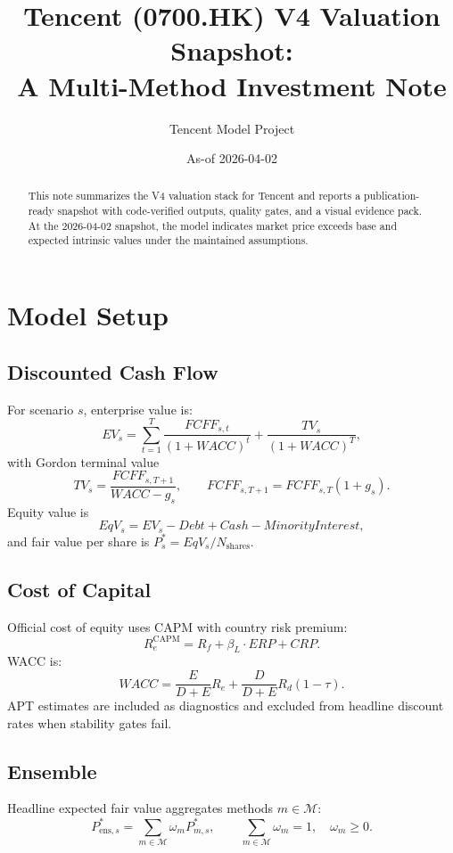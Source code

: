 \documentclass[11pt]{article}
\title{Tencent (0700.HK) V4 Valuation Snapshot:\\A Multi-Method Investment Note}
\author{Tencent Model Project}
\date{As-of 2026-04-02}
\begin{document}
\maketitle

\begin{abstract}
This note summarizes the V4 valuation stack for Tencent and reports a publication-ready
snapshot with code-verified outputs, quality gates, and a visual evidence pack.
At the 2026-04-02 snapshot, the model indicates market price exceeds base and
expected intrinsic values under the maintained assumptions.
\end{abstract}

\section{Model Setup}

\subsection{Discounted Cash Flow}
For scenario $s$, enterprise value is:
\begin{equation}
EV_s = \sum_{t=1}^{T} \frac{FCFF_{s,t}}{(1+WACC)^t}
+ \frac{TV_s}{(1+WACC)^T},
\end{equation}
with Gordon terminal value
\begin{equation}
TV_s = \frac{FCFF_{s,T+1}}{WACC - g_s}, \qquad FCFF_{s,T+1}=FCFF_{s,T}(1+g_s).
\end{equation}
Equity value is
\begin{equation}
EqV_s = EV_s - Debt + Cash - MinorityInterest,
\end{equation}
and fair value per share is $P^{\ast}_s = EqV_s/N_{\text{shares}}$.

\subsection{Cost of Capital}
Official cost of equity uses CAPM with country risk premium:
\begin{equation}
R_e^{\mathrm{CAPM}} = R_f + \beta_L \cdot ERP + CRP.
\end{equation}
WACC is:
\begin{equation}
WACC = \frac{E}{D+E}R_e + \frac{D}{D+E}R_d(1-\tau).
\end{equation}
APT estimates are included as diagnostics and excluded from headline discount rates when
stability gates fail.

\subsection{Ensemble}
Headline expected fair value aggregates methods $m \in \mathcal{M}$:
\begin{equation}
P^{\ast}_{\text{ens},s} = \sum_{m \in \mathcal{M}} \omega_m P^{\ast}_{m,s},
\qquad \sum_{m \in \mathcal{M}} \omega_m = 1,\quad \omega_m \ge 0.
\end{equation}
\end{document}
